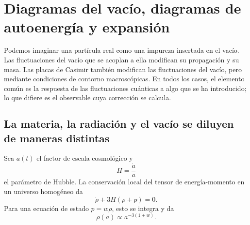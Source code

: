 \section{Diagramas del vacío, diagramas de autoenergía y expansión}

\begin{classroomqa}
\end{classroomqa}

Podemos imaginar una partícula real como una impureza insertada en el vacío. Las fluctuaciones del vacío que se acoplan a ella modifican su propagación y su masa. Las placas de Casimir también modifican las fluctuaciones del vacío, pero mediante condiciones de contorno macroscópicas. En todos los casos, el elemento común es la respuesta de las fluctuaciones cuánticas a algo que se ha introducido; lo que difiere es el observable cuya corrección se calcula.

\vspace{-2pt}
\subsection{La materia, la radiación y el vacío se diluyen de maneras distintas}

Sea \(a(t)\) el factor de escala cosmológico y
\begin{equation}
H=\frac{\dot a}{a}
\end{equation}
el parámetro de Hubble. La conservación local del tensor de energía-momento en un universo homogéneo da
\begin{equation}
\dot\rho+3H(\rho+p)=0.
\end{equation}
Para una ecuación de estado \(p=w\rho\), esto se integra y da
\begin{equation}
\rho(a)\propto a^{-3(1+w)}.
\end{equation}

